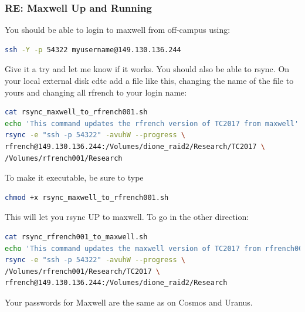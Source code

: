 \documentclass[crop=false,class=book]{standalone}
\begin{document}
\subsubsection{\footnotesize RE: Maxwell Up and Running}
You should be able to login to maxwell from off-campus using:
\begin{lstlisting}[language=bash,basicstyle=\footnotesize]
ssh -Y -p 54322 myusername@149.130.136.244
\end{lstlisting}
Give it a try and let me know if it works. 
You should also be able to rsync. On your local external disk
cdtc
add a file like this, changing the name of the file to yours and changing all rfrench to your login name:
\begin{lstlisting}[language=bash,basicstyle=\footnotesize]
cat rsync_maxwell_to_rfrench001.sh
echo 'This command updates the rfrench version of TC2017 from maxwell'
rsync -e "ssh -p 54322" -avuhW --progress \
rfrench@149.130.136.244:/Volumes/dione_raid2/Research/TC2017 \
/Volumes/rfrench001/Research
\end{lstlisting}
To make it executable, be sure to type
\begin{lstlisting}[language=bash,basicstyle=\footnotesize]
chmod +x rsync_maxwell_to_rfrench001.sh
\end{lstlisting}
This will let you rsync UP to maxwell. To go in the other direction:
\begin{lstlisting}[language=bash,basicstyle=\footnotesize]
cat rsync_rfrench001_to_maxwell.sh
echo 'This command updates the maxwell version of TC2017 from rfrench001'
rsync -e "ssh -p 54322" -avuhW --progress \
/Volumes/rfrench001/Research/TC2017 \
rfrench@149.130.136.244:/Volumes/dione_raid2/Research
\end{lstlisting}
Your passwords for Maxwell are the same as on Cosmos and Uranus.
\end{document}

